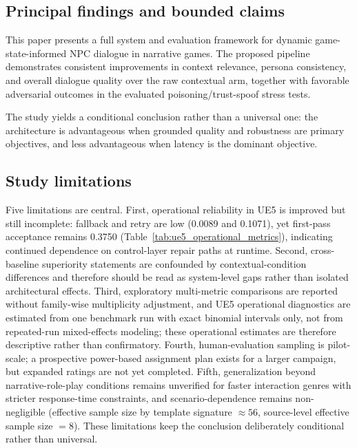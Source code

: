 ﻿\documentclass[a4paper,12pt]{article}
\begin{document}
\subsection{Principal findings and bounded claims}
This paper presents a full system and evaluation framework for dynamic game-state-informed NPC dialogue in narrative games. The proposed pipeline demonstrates consistent improvements in context relevance, persona consistency, and overall dialogue quality over the raw contextual arm, together with favorable adversarial outcomes in the evaluated poisoning/trust-spoof stress tests.

The study yields a conditional conclusion rather than a universal one: the architecture is advantageous when grounded quality and robustness are primary objectives, and less advantageous when latency is the dominant objective.

\subsection{Study limitations}
Five limitations are central. First, operational reliability in UE5 is improved but still incomplete: fallback and retry are low (0.0089 and 0.1071), yet first-pass acceptance remains 0.3750 (Table~\ref{tab:ue5_operational_metrics}), indicating continued dependence on control-layer repair paths at runtime. Second, cross-baseline superiority statements are confounded by contextual-condition differences and therefore should be read as system-level gaps rather than isolated architectural effects. Third, exploratory multi-metric comparisons are reported without family-wise multiplicity adjustment, and UE5 operational diagnostics are estimated from one benchmark run with exact binomial intervals only, not from repeated-run mixed-effects modeling; these operational estimates are therefore descriptive rather than confirmatory. Fourth, human-evaluation sampling is pilot-scale; a prospective power-based assignment plan exists for a larger campaign, but expanded ratings are not yet completed. Fifth, generalization beyond narrative-role-play conditions remains unverified for faster interaction genres with stricter response-time constraints, and scenario-dependence remains non-negligible (effective sample size by template signature \(\approx 56\), source-level effective sample size \(=8\)). These limitations keep the conclusion deliberately conditional rather than universal.
\end{document}
